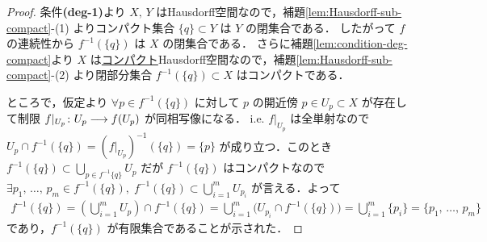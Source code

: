 \documentclass[algtopo_main]{subfiles}
\begin{document}
\begin{proof}
    条件\textbf{\textsf{(deg-1)}}より $X,\, Y$ はHausdorff空間なので，補題\ref{lem:Hausdorff-sub-compact}-(1) よりコンパクト集合 $\{q\} \subset Y$ は $Y$ の閉集合である．
    したがって $f$ の連続性から $f^{-1}(\{q\})$ は $X$ の閉集合である．
    さらに補題\ref{lem:condition-deg-compact}より $X$ は\hyperref[def:compact]{コンパクト}Hausdorff空間なので，補題\ref{lem:Hausdorff-sub-compact}-(2) より閉部分集合 $f^{-1}(\{q\}) \subset X$ はコンパクトである．

    ところで，仮定より $\forall p \in f^{-1}(\{q\})$ に対して $p$ の開近傍 $p \in U_p \subset X$ が存在して制限 $f|_{U_p} \colon U_p \longrightarrow f(U_p)$ が同相写像になる．
    i.e. $f|_{U_p}$ は全単射なので $U_p \cap f^{-1}(\{q\}) = (f|_{U_p})^{-1}(\{q\}) = \{p\}$ が成り立つ．このとき
    $f^{-1}(\{q\}) \subset \bigcup_{p \in f^{-1}\{q\}} U_p$ だが $f^{-1}(\{q\})$ はコンパクトなので $\exists p_1,\, \dots ,\, p_m \in f^{-1}(\{q\}),\; f^{-1}(\{q\}) \subset \bigcup_{i=1}^m U_{p_i}$ 
    が言える．よって
    \begin{align}
        f^{-1}(\{q\}) = \left(\bigcup_{i=1}^m U_p \right) \cap f^{-1}(\{q\}) = \bigcup_{i=1}^m \bigl( U_{p_i} \cap f^{-1}(\{q\}) \bigr) = \bigcup_{i=1}^m \{p_i\} = \{p_1,\, \dots ,\, p_m \}
    \end{align}
    であり，$f^{-1}(\{q\})$ が有限集合であることが示された．
    

\end{proof}
\end{document}
